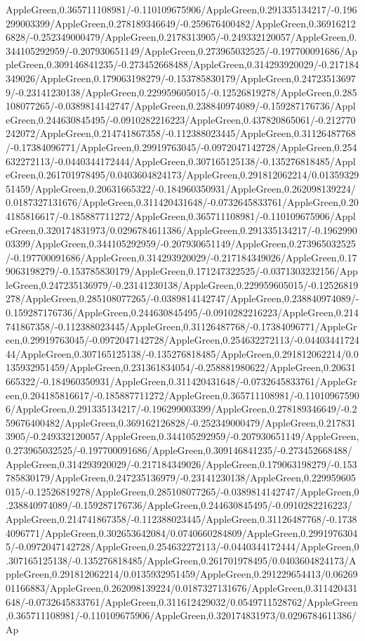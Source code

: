 {\begin{tikzternal}
{AppleGreen,0.365711108981/-0.110109675906/AppleGreen,0.291335134217/-0.196299003399/AppleGreen,0.278189346649/-0.259676400482/AppleGreen,0.369162126828/-0.252349000479/AppleGreen,0.2178313905/-0.249332120057/AppleGreen,0.344105292959/-0.207930651149/AppleGreen,0.273965032525/-0.197700091686/AppleGreen,0.309146841235/-0.273452668488/AppleGreen,0.314293920029/-0.217184349026/AppleGreen,0.179063198279/-0.153785830179/AppleGreen,0.247235136979/-0.23141230138/AppleGreen,0.229959605015/-0.12526819278/AppleGreen,0.285108077265/-0.0389814142747/AppleGreen,0.238840974089/-0.159287176736/AppleGreen,0.244630845495/-0.0910282216223/AppleGreen,0.437820865061/-0.212770242072/AppleGreen,0.214741867358/-0.112388023445/AppleGreen,0.31126487768/-0.17384096771/AppleGreen,0.29919763045/-0.0972047142728/AppleGreen,0.254632272113/-0.0440344172444/AppleGreen,0.307165125138/-0.135276818485/AppleGreen,0.261701978495/0.0403604824173/AppleGreen,0.291812062214/0.0135932951459/AppleGreen,0.20631665322/-0.184960350931/AppleGreen,0.262098139224/0.0187327131676/AppleGreen,0.311420431648/-0.0732645833761/AppleGreen,0.204185816617/-0.185887711272/AppleGreen,0.365711108981/-0.110109675906/AppleGreen,0.320174831973/0.0296784611386/AppleGreen,0.291335134217/-0.196299003399/AppleGreen,0.344105292959/-0.207930651149/AppleGreen,0.273965032525/-0.197700091686/AppleGreen,0.314293920029/-0.217184349026/AppleGreen,0.179063198279/-0.153785830179/AppleGreen,0.171247322525/-0.0371303232156/AppleGreen,0.247235136979/-0.23141230138/AppleGreen,0.229959605015/-0.12526819278/AppleGreen,0.285108077265/-0.0389814142747/AppleGreen,0.238840974089/-0.159287176736/AppleGreen,0.244630845495/-0.0910282216223/AppleGreen,0.214741867358/-0.112388023445/AppleGreen,0.31126487768/-0.17384096771/AppleGreen,0.29919763045/-0.0972047142728/AppleGreen,0.254632272113/-0.0440344172444/AppleGreen,0.307165125138/-0.135276818485/AppleGreen,0.291812062214/0.0135932951459/AppleGreen,0.231361834054/-0.258881980622/AppleGreen,0.20631665322/-0.184960350931/AppleGreen,0.311420431648/-0.0732645833761/AppleGreen,0.204185816617/-0.185887711272/AppleGreen,0.365711108981/-0.110109675906/AppleGreen,0.291335134217/-0.196299003399/AppleGreen,0.278189346649/-0.259676400482/AppleGreen,0.369162126828/-0.252349000479/AppleGreen,0.2178313905/-0.249332120057/AppleGreen,0.344105292959/-0.207930651149/AppleGreen,0.273965032525/-0.197700091686/AppleGreen,0.309146841235/-0.273452668488/AppleGreen,0.314293920029/-0.217184349026/AppleGreen,0.179063198279/-0.153785830179/AppleGreen,0.247235136979/-0.23141230138/AppleGreen,0.229959605015/-0.12526819278/AppleGreen,0.285108077265/-0.0389814142747/AppleGreen,0.238840974089/-0.159287176736/AppleGreen,0.244630845495/-0.0910282216223/AppleGreen,0.214741867358/-0.112388023445/AppleGreen,0.31126487768/-0.17384096771/AppleGreen,0.302653642084/0.0740660284809/AppleGreen,0.29919763045/-0.0972047142728/AppleGreen,0.254632272113/-0.0440344172444/AppleGreen,0.307165125138/-0.135276818485/AppleGreen,0.261701978495/0.0403604824173/AppleGreen,0.291812062214/0.0135932951459/AppleGreen,0.291229654413/0.0626901166883/AppleGreen,0.262098139224/0.0187327131676/AppleGreen,0.311420431648/-0.0732645833761/AppleGreen,0.311612429032/0.0549711528762/AppleGreen,0.365711108981/-0.110109675906/AppleGreen,0.320174831973/0.0296784611386/Ap}
\end{tikzternal}}
